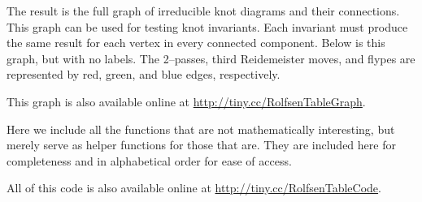 \begin{paper}

The result is the full graph of irreducible knot diagrams and their connections.
This graph can be used for testing knot invariants.
Each invariant must produce the same result for each vertex in every connected
component.
Below is this graph, but with no labels.
The 2--passes, third Reidemeister moves, and flypes are represented by red,
green, and blue edges, respectively.

\vspace{-3.5em}
\begin{center}\end{center}
\vspace{-2.5em}

This graph is also available online at \url{http://tiny.cc/RolfsenTableGraph}.


Here we include all the functions that are not mathematically interesting, but
merely serve as helper functions for those that are.
They are included here for completeness and in alphabetical order for ease of
access.

All of this code is also available online at
\url{http://tiny.cc/RolfsenTableCode}.

\noindent\hspace{-1.75in}

\noindent\hspace{-1.75in}

\noindent\hspace{-1.75in}

\noindent\hspace{-1.75in}\\

\noindent\hspace{-1.75in}

\noindent\hspace{-1.75in}

\noindent\hspace{-1.75in}

\noindent\hspace{-1.75in}

\noindent\hspace{-1.75in}


\end{paper}
